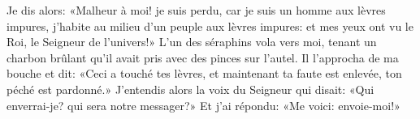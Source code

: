 Je dis alors: «Malheur à moi! je suis perdu,
	car je suis un homme aux lèvres impures,
	j’habite au milieu d’un peuple aux lèvres impures:
	et mes yeux ont vu le Roi, le Seigneur de l’univers!»
L’un des séraphins vola vers moi,
	tenant un charbon brûlant qu’il avait pris avec des pinces sur l’autel.
Il l’approcha de ma bouche et dit:
	«Ceci a touché tes lèvres,
	et maintenant ta faute est enlevée, ton péché est pardonné.»
J’entendis alors la voix du Seigneur qui disait:
	«Qui enverrai-je? qui sera notre messager?»
Et j’ai répondu: «Me voici: envoie-moi!»
